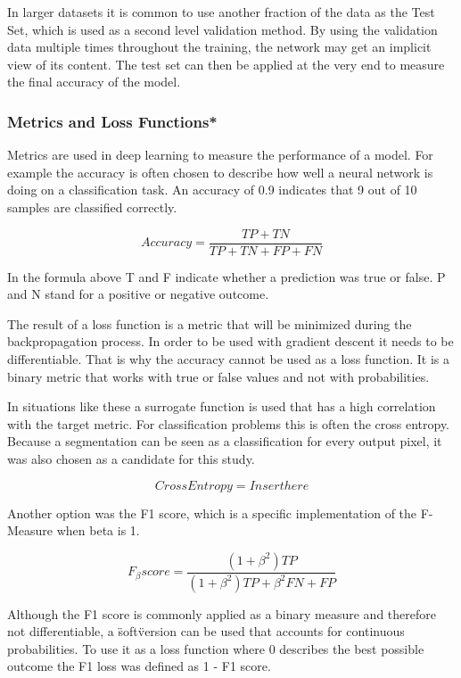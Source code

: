 In larger datasets it is common to use another fraction of the data as the Test Set, which is used as a second level validation method. By using the validation data multiple times throughout the training, the network may get an implicit view of its content. The test set can then be applied at the very end to measure the final accuracy of the model.

\subsubsection{Metrics and Loss Functions*}

Metrics are used in deep learning to measure the performance of a model. For example the accuracy is often chosen to describe how well a neural network is doing on a classification task. An accuracy of 0.9 indicates that 9 out of 10 samples are classified correctly.

\begin{equation}
Accuracy = \frac{TP+TN}{TP+TN+FP+FN}
\end{equation}

In the formula above T and F indicate whether a prediction was true or false. P and N stand for a positive or negative outcome.

The result of a loss function is a metric that will be minimized during the backpropagation process. In order to be used with gradient descent it needs to be differentiable. That is why the accuracy cannot be used as a loss function. It is a binary metric that works with true or false values and not with probabilities.

In situations like these a surrogate function is used that has a high correlation with the target metric. For classification problems this is often the cross entropy. Because a segmentation can be seen as a classification for every output pixel, it was also chosen as a candidate for this study.

\begin{equation}
Cross Entropy = Insert here
\end{equation}

Another option was the F1 score, which is a specific implementation of the F-Measure when beta is 1. 

\begin{equation}
F_\beta score= \frac{(1 + \beta^2) TP}{(1+\beta^2)TP+\beta^2FN+FP}
\end{equation}

Although the F1 score is commonly applied as a binary measure and therefore not differentiable, a \"soft\" version can be used that accounts for continuous probabilities. To use it as a loss function where 0 describes the best possible outcome the F1 loss was defined as 1 - F1 score.

